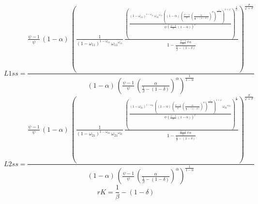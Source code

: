 \begin{dmath*}
L1ss = \frac{\frac{{{\psi}}-1}{{{\psi}}}\, \left(1-{{\alpha}}\right)\, \left(\frac{1}{\left(1-{{\omega_{11}}}\right)^{1-{{\omega_{11}}}}\, {{\omega_{11}}}^{{{\omega_{11}}}}}\, \frac{\left(\frac{\left(1-{{\omega_{11}}}\right)^{1-{{\omega_{11}}}}\, {{\omega_{11}}}^{{{\omega_{11}}}}\, \left(\left(1-{{\alpha}}\right)\, \left(\frac{{{\psi}}-1}{{{\psi}}}\, \left(\frac{{{\alpha}}}{\frac{1}{{{\beta}}}-\left(1-{{\delta}}\right)}\right)^{{{\alpha}}}\right)^{\frac{1}{1-{{\alpha}}}}\right)^{1+{{\varphi}}}}{{{\phi}}\, \left(\frac{{{\psi}}-1}{{{\psi}}}\, \left(1-{{\alpha}}\right)\right)^{{{\varphi}}}}\right)^{\frac{1}{{{\sigma}}}}}{1-\frac{\frac{{{\psi}}-1}{{{\psi}}}\, {{\delta}}\, {{\alpha}}}{\frac{1}{{{\beta}}}-\left(1-{{\delta}}\right)}}\right)^{\frac{{{\sigma}}}{{{\varphi}}+{{\sigma}}}}}{\left(1-{{\alpha}}\right)\, \left(\frac{{{\psi}}-1}{{{\psi}}}\, \left(\frac{{{\alpha}}}{\frac{1}{{{\beta}}}-\left(1-{{\delta}}\right)}\right)^{{{\alpha}}}\right)^{\frac{1}{1-{{\alpha}}}}}
\end{dmath*}
\begin{dmath*}
L2ss = \frac{\frac{{{\psi}}-1}{{{\psi}}}\, \left(1-{{\alpha}}\right)\, \left(\frac{1}{\left(1-{{\omega_{21}}}\right)^{1-{{\omega_{21}}}}\, {{\omega_{21}}}^{{{\omega_{21}}}}}\, \frac{\left(\frac{\left(1-{{\omega_{21}}}\right)^{1-{{\omega_{21}}}}\, \left(\left(1-{{\alpha}}\right)\, \left(\frac{{{\psi}}-1}{{{\psi}}}\, \left(\frac{{{\alpha}}}{\frac{1}{{{\beta}}}-\left(1-{{\delta}}\right)}\right)^{{{\alpha}}}\right)^{\frac{1}{1-{{\alpha}}}}\right)^{1+{{\varphi}}}\, {{\omega_{21}}}^{{{\omega_{21}}}}}{{{\phi}}\, \left(\frac{{{\psi}}-1}{{{\psi}}}\, \left(1-{{\alpha}}\right)\right)^{{{\varphi}}}}\right)^{\frac{1}{{{\sigma}}}}}{1-\frac{\frac{{{\psi}}-1}{{{\psi}}}\, {{\delta}}\, {{\alpha}}}{\frac{1}{{{\beta}}}-\left(1-{{\delta}}\right)}}\right)^{\frac{{{\sigma}}}{{{\varphi}}+{{\sigma}}}}}{\left(1-{{\alpha}}\right)\, \left(\frac{{{\psi}}-1}{{{\psi}}}\, \left(\frac{{{\alpha}}}{\frac{1}{{{\beta}}}-\left(1-{{\delta}}\right)}\right)^{{{\alpha}}}\right)^{\frac{1}{1-{{\alpha}}}}}
\end{dmath*}
\begin{dmath*}
rK = \frac{1}{{{\beta}}}-\left(1-{{\delta}}\right)
\end{dmath*}
